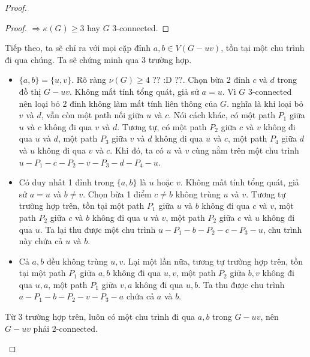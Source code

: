 \begin{proof}
\begin{enumerate}
\begin{proof}
                  $\Rightarrow \kappa(G) \geq 3$ hay $G$ 3-connected.
              \end{proof}
              Tiếp theo, ta sẽ chỉ ra với mọi cặp đỉnh $a,b \in V(G-uv)$, tồn tại một chu trình đi qua chúng.
              Ta sẽ chứng minh qua 3 trường hợp.
              \begin{itemize}
                  \item $\{a,b\} = \{u,v\}$. Rõ ràng $\nu(G) \geq 4$ ?? :D ??. Chọn bừa 2 đỉnh $c$ và $d$ trong đồ thị $G-uv$.
                        Không mất tính tổng quát, giả sử $a=u$. Vì $G$ 3-connected nên loại bỏ 2 đỉnh không làm mất tính liên thông của $G$.
                        nghĩa là khi loại bỏ $v$ và $d$, vẫn còn một path nối giữa $u$ và $c$. Nói cách khác, có một path $P_1$ giữa $u$ và $c$ không đi qua $v$ và $d$.
                        Tương tự, có một path $P_2$ giữa $c$ và $v$ không đi qua $u$ và $d$,
                        một path $P_3$ giữa $v$ và $d$ không đi qua $u$ và $c$,
                        một path $P_4$ giữa $d$ và $u$ không đi qua $v$ và $c$.
                        Khi đó, ta có $u$ và $v$ cùng nằm trên một chu trình $u-P_1-c-P_2-v-P_3-d-P_4-u$.
                  \item Có duy nhất 1 đỉnh trong $\{a,b\}$ là $u$ hoặc $v$. Không mất tính tổng quát, giả sử $a=u$ và $b \neq v$.
                        Chọn bừa 1 điểm $c \neq b$ không trùng $u$ và $v$. Tương tự trường hợp trên,
                        tồn tại một path $P_1$ giữa $u$ và $b$ không đi qua $c$ và $v$,
                        một path $P_2$ giữa $c$ và $b$ không đi qua $u$ và $v$,
                        một path $P_2$ giữa $c$ và $u$ không đi qua $u$. Ta lại thu được một chu trình $u-P_1-b-P_2-c-P_3-u$, chu trình này chứa cả $u$ và $b$.
                  \item Cả $a,b$ đều không trùng $u,v$. Lại một lần nữa, tương tự trường hợp trên,
                        tồn tại một path $P_1$ giữa $a,b$ không đi qua $u,v$,
                        một path $P_2$ giữa $b,v$ không đi qua $u,a$,
                        một path $P_1$ giữa $v,a$ không đi qua $u,b$. Ta thu được chu trình $a-P_1-b-P_2-v-P_3-a$ chứa cả $a$ và $b$.
              \end{itemize}
              Từ 3 trường hợp trên, luôn có một chu trình đi qua $a,b$ trong $G-uv$, nên $G-uv$ phải 2-connected.

              \begin{tikzpicture}

              \end{tikzpicture}
    \end{enumerate}



\end{proof}
